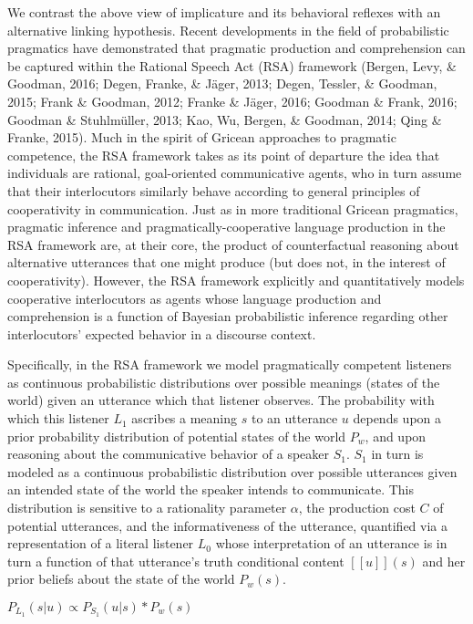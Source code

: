 \documentclass[man]{apa6}
\theoremstyle{definition}
\theoremstyle{definition}
\theoremstyle{definition}
\theoremstyle{remark}
\begin{document}
We contrast the above view of implicature and its behavioral reflexes
with an alternative linking hypothesis. Recent developments in the field
of probabilistic pragmatics have demonstrated that pragmatic production
and comprehension can be captured within the Rational Speech Act (RSA)
framework (Bergen, Levy, \& Goodman, 2016; Degen, Franke, \& Jäger,
2013; Degen, Tessler, \& Goodman, 2015; Frank \& Goodman, 2012; Franke
\& Jäger, 2016; Goodman \& Frank, 2016; Goodman \& Stuhlmüller, 2013;
Kao, Wu, Bergen, \& Goodman, 2014; Qing \& Franke, 2015). Much in the spirit of Gricean approaches to
pragmatic competence, the RSA framework takes as its point of departure
the idea that individuals are rational, goal-oriented communicative
agents, who in turn assume that their interlocutors similarly behave
according to general principles of cooperativity in communication. Just
as in more traditional Gricean pragmatics, pragmatic inference and
pragmatically-cooperative language production in the RSA framework are,
at their core, the product of counterfactual reasoning about alternative
utterances that one might produce (but does not, in the interest of
cooperativity). However, the RSA framework explicitly and quantitatively
models cooperative interlocutors as agents whose language production and
comprehension is a function of Bayesian probabilistic inference
regarding other interlocutors' expected behavior in a discourse context.

Specifically, in the RSA framework we model pragmatically competent
listeners as continuous probabilistic distributions over possible
meanings (states of the world) given an utterance which that listener
observes. The probability with which this listener \(L_1\) ascribes a
meaning \(s\) to an utterance \(u\) depends upon a prior probability
distribution of potential states of the world \(P_w\), and upon
reasoning about the communicative behavior of a speaker \(S_1\). \(S_1\)
in turn is modeled as a continuous probabilistic distribution over
possible utterances given an intended state of the world the speaker
intends to communicate. This distribution is sensitive to a rationality
parameter \(\alpha\), the production cost \(C\) of potential utterances,
and the informativeness of the utterance, quantified via a
representation of a literal listener \(L_0\) whose interpretation of an
utterance is in turn a function of that utterance's truth conditional
content \([[u]](s)\) and her prior beliefs about the state of the world
\(P_w(s)\).

\(P_{L_1}(s | u) \propto P_{S_1}(u | s) * P_w(s)\)
\end{document}
